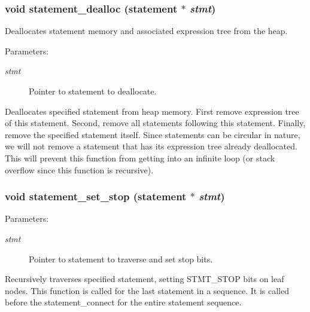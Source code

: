 \subsubsection{\setlength{\rightskip}{0pt plus 5cm}void statement\_\-dealloc ({\bf statement} $\ast$ {\em stmt})}\label{statement_8c_a5}


Deallocates statement memory and associated expression tree from the heap.

\begin{Desc}
\item[Parameters: ]\par
\begin{description}
\item[{\em 
stmt}]Pointer to statement to deallocate.\end{description}
\end{Desc}
Deallocates specified statement from heap memory. First remove expression tree of this statement. Second, remove all statements following this statement. Finally, remove the specified statement itself. Since statements can be circular in nature, we will not remove a statement that has its expression tree already deallocated. This will prevent this function from getting into an infinite loop (or stack overflow since this function is recursive). 
\subsubsection{\setlength{\rightskip}{0pt plus 5cm}void statement\_\-set\_\-stop ({\bf statement} $\ast$ {\em stmt})}\label{statement_8c_a4}


\begin{Desc}
\item[Parameters: ]\par
\begin{description}
\item[{\em 
stmt}]Pointer to statement to traverse and set stop bits.\end{description}
\end{Desc}
Recursively traverses specified statement, setting STMT\_\-STOP bits on leaf nodes. This function is called for the last statement in a sequence. It is called before the statement\_\-connect for the entire statement sequence. 